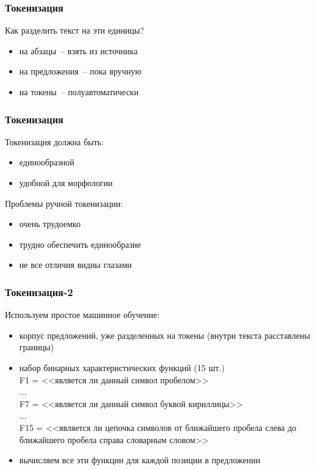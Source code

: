 \documentclass{beamer}
\begin{document}
\begin{frame}
\frametitle{Токенизация}
Как разделить текст на эти единицы?
\begin{itemize}
\item{на абзацы~-- взять из источника}
\pause
\item{на предложения~-- пока вручную}
\pause
\item{на токены~-- полуавтоматически}
\end{itemize}
\end{frame}

\begin{frame}
\frametitle{Токенизация}
Токенизация должна быть:
\begin{itemize}
\item{единообразной}
\item{удобной для морфологии}
\end{itemize}
Проблемы ручной токенизации:
\begin{itemize}
\item{очень трудоемко}
\item{трудно обеспечить единообразие}
\item{не все отличия видны глазами}
\end{itemize}
\end{frame}

\begin{frame}
\frametitle{Токенизация-2}
Используем простое машинное обучение:
\begin{itemize}
\item{корпус предложений, уже разделенных на токены (внутри текста расставлены границы)}
\pause
\item{набор бинарных характеристических функций (15 шт.)} \\
F1 = <<является ли данный символ пробелом>> \\
... \\
F7 = <<является ли данный символ буквой кириллицы>> \\
... \\
F15 = <<является ли цепочка символов от ближайшего пробела слева до ближайшего пробела справа словарным словом>>
\pause
\item{вычисляем все эти функции для каждой позиции в предложении}
\end{itemize}
\end{frame}
\end{document}
